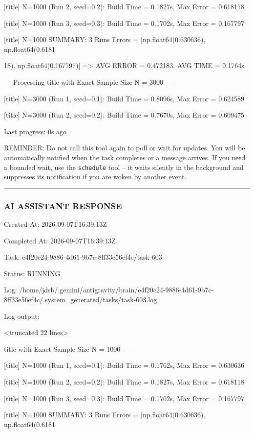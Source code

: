 \documentclass[11pt,a4paper]{article}
\begin{document}
[title] N=1000 (Run 2, seed=0.2): Build Time = 0.1827s, Max Error = 0.618118

[title] N=1000 (Run 3, seed=0.3): Build Time = 0.1702s, Max Error = 0.167797

[title] N=1000 SUMMARY: 3 Runs Errors = [np.float64(0.630636), np.float64(0.6181

18), np.float64(0.167797)] => AVG ERROR = 0.472183, AVG TIME = 0.1764s

--- Processing title with Exact Sample Size N = 3000 ---

[title] N=3000 (Run 1, seed=0.1): Build Time = 0.8096s, Max Error = 0.624589

[title] N=3000 (Run 2, seed=0.2): Build Time = 0.7670s, Max Error = 0.609475


Last progress: 0s ago



REMINDER: Do not call this tool again to poll or wait for updates. You will be automatically notified when the task completes or a message arrives. If you need a bounded wait, use the \texttt{schedule} tool -- it waits silently in the background and suppresses its notification if you are woken by another event.


\hrule

\subsubsection{AI ASSISTANT RESPONSE}

Created At: 2026-09-07T16:39:13Z

Completed At: 2026-09-07T16:39:13Z

Task: e4f20c24-9886-4d61-9b7c-8ff33e56ef4c/task-603

Status: RUNNING

Log: /home/jdsb/.gemini/antigravity/brain/e4f20c24-9886-4d61-9b7c-8ff33e56ef4c/.system\_generated/tasks/task-603.log

Log output:

<truncated 22 lines>

title with Exact Sample Size N = 1000 ---

[title] N=1000 (Run 1, seed=0.1): Build Time = 0.1762s, Max Error = 0.630636

[title] N=1000 (Run 2, seed=0.2): Build Time = 0.1827s, Max Error = 0.618118

[title] N=1000 (Run 3, seed=0.3): Build Time = 0.1702s, Max Error = 0.167797

[title] N=1000 SUMMARY: 3 Runs Errors = [np.float64(0.630636), np.float64(0.6181
\end{document}
